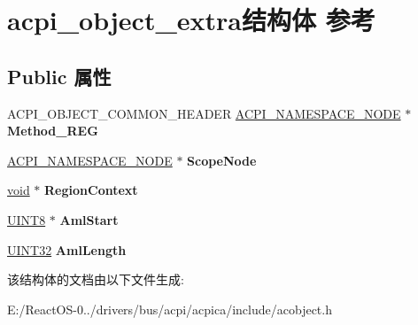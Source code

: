 \hypertarget{structacpi__object__extra}{}\section{acpi\+\_\+object\+\_\+extra结构体 参考}
\label{structacpi__object__extra}
\subsection*{Public 属性}
\begin{DoxyCompactItemize}
\item 
\mbox{\label{structacpi__object__extra_a8b0d04ad8445b4c8b926dc08d9d1fbb6}} 
A\+C\+P\+I\+\_\+\+O\+B\+J\+E\+C\+T\+\_\+\+C\+O\+M\+M\+O\+N\+\_\+\+H\+E\+A\+D\+ER \hyperlink{structacpi__namespace__node}{A\+C\+P\+I\+\_\+\+N\+A\+M\+E\+S\+P\+A\+C\+E\+\_\+\+N\+O\+DE} $\ast$ {\bfseries Method\+\_\+\+R\+EG}
\item 
\mbox{\label{structacpi__object__extra_aa5e8e700c601bc65dd4431bd57fe14fa}} 
\hyperlink{structacpi__namespace__node}{A\+C\+P\+I\+\_\+\+N\+A\+M\+E\+S\+P\+A\+C\+E\+\_\+\+N\+O\+DE} $\ast$ {\bfseries Scope\+Node}
\item 
\mbox{\label{structacpi__object__extra_afd6aeec87bdf8abfb87d028b05e7e37e}} 
\hyperlink{interfacevoid}{void} $\ast$ {\bfseries Region\+Context}
\item 
\mbox{\label{structacpi__object__extra_aad769c64ca822fa14302b561d0c9cf5e}} 
\hyperlink{_processor_bind_8h_ab27e9918b538ce9d8ca692479b375b6a}{U\+I\+N\+T8} $\ast$ {\bfseries Aml\+Start}
\item 
\mbox{\label{structacpi__object__extra_a943f7f1dc4ac551be11cae3121c5c91d}} 
\hyperlink{_processor_bind_8h_ae1e6edbbc26d6fbc71a90190d0266018}{U\+I\+N\+T32} {\bfseries Aml\+Length}
\end{DoxyCompactItemize}


该结构体的文档由以下文件生成\+:\begin{DoxyCompactItemize}
\item 
E\+:/\+React\+O\+S-\/0../drivers/bus/acpi/acpica/include/acobject.\+h\end{DoxyCompactItemize}
